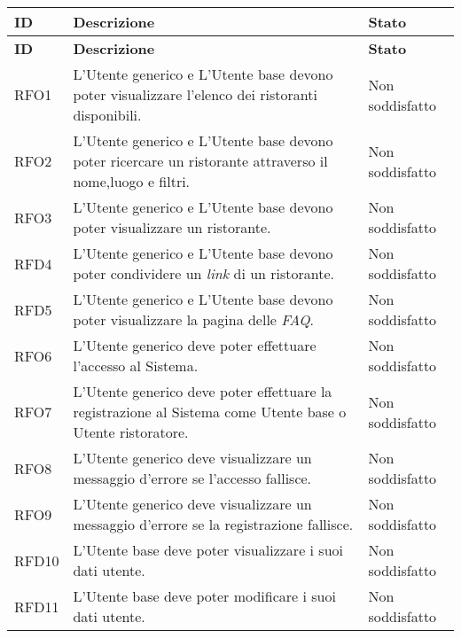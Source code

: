 \begin{longtable}{|l|p{}|p{3cm}|}
	\hline
	\textbf{ID} & \textbf{Descrizione}                                                                                                    & \textbf{Stato}  \\
	\endfirsthead
	\hline
	\textbf{ID} & \textbf{Descrizione}                                                                                                    & \textbf{Stato}  \\
	\hline
	\endhead
	\hline
	RFO1        & L'Utente generico e L'Utente base devono poter visualizzare l'elenco dei ristoranti disponibili.                        & Non soddisfatto \\
	\hline
	RFO2        & L'Utente generico e L'Utente base devono poter ricercare un ristorante attraverso il nome,luogo e filtri.               & Non soddisfatto \\
	\hline
	RFO3        & L'Utente generico e L'Utente base devono poter visualizzare un ristorante.                                              & Non soddisfatto \\
	\hline
	RFD4        & L'Utente generico e L'Utente base devono poter condividere un \textit{link} di un ristorante.                           & Non soddisfatto \\
	\hline
	RFD5        & L'Utente generico e L'Utente base devono poter visualizzare la pagina delle  \textit{FAQ\g}.                            & Non soddisfatto \\
	\hline
	RFO6        & L'Utente generico deve poter effettuare l'accesso al Sistema.                                                           & Non soddisfatto \\
	\hline
	RFO7        & L'Utente generico deve poter effettuare la registrazione al Sistema come Utente base o Utente ristoratore.              & Non soddisfatto \\
	\hline
	RFO8        & L'Utente generico deve visualizzare un messaggio d'errore se l'accesso fallisce.                                        & Non soddisfatto \\
	\hline
	RFO9        & L'Utente generico deve visualizzare un messaggio d'errore se la registrazione fallisce.                                 & Non soddisfatto \\
	\hline
	RFD10       & L'Utente base deve poter visualizzare i suoi dati utente.                                                               & Non soddisfatto \\
	\hline
	RFD11       & L'Utente base deve poter modificare i suoi dati utente.                                                                 & Non soddisfatto \\

\end{longtable}
